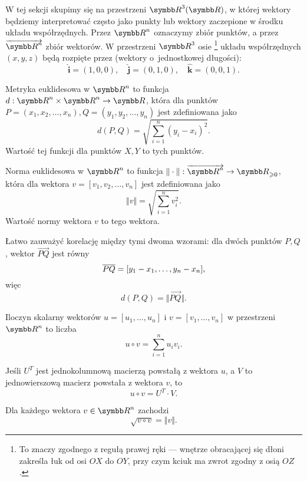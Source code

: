 W tej sekcji skupimy się na przestrzeni $\RR^3(\RR)$, w której wektory będziemy interpretować często jako punkty lub wektory zaczepione w środku układu współrzędnych. Przez $\RR^n$ oznaczymy zbiór punktów, a przez $\overrightarrow{\RR^n}$ zbiór wektorów. W przestrzeni $\RR^3$ osie \footnote{To znaczy zgodnego z regułą prawej ręki --- wnętrze obracającej się dłoni zakreśla łuk od osi $OX$ do $OY$, przy czym kciuk ma zwrot zgodny z osią $OZ$.} układu współrzędnych $(x, y, z)$ będą rozpięte przez  (wektory o~jednostkowej długości):
\[ \symbf{\hat{i}} = (1, 0, 0), \quad \symbf{\hat{j}} = (0, 1, 0), \quad \symbf{\hat{k}} = (0, 0, 1). \]

\begin{definition}
    \label{d:Euclidean metric}
    Metryka euklidesowa w $\RR^n$ to funkcja $d : \RR^n \times \RR^n \to \RR$, która dla punktów $P = (x_1, x_2, \ldots, x_n), Q = (y_1, y_2, \ldots, y_n)$ jest zdefiniowana jako
    \[ d(P, Q) = \sqrt{\sum_{i = 1}^n (y_i - x_i)^2}. \]
    Wartość tej funkcji dla punktów $X, Y$ to  tych punktów.
\end{definition}

\begin{definition}
    Norma euklidesowa w $\RR^n$ to funkcja $\Vert\cdot\Vert : \overrightarrow{\RR^n} \to \RR_{\geq 0}$, która dla wektora $v = [v_1, v_2, \ldots, v_n]$ jest zdefiniowana jako
    \[ \Vert v\Vert = \sqrt{\sum_{i=1}^n v_i^2}. \]
    Wartość normy wektora $v$ to  tego wektora.
\end{definition}

Łatwo zauważyć korelację między tymi dwoma wzorami: dla dwóch punktów $P, Q$, wektor $\overrightarrow{PQ}$ jest równy
\[ \overline{PQ} = [y_1 - x_1, \ldots, y_n - x_n], \]
więc
\[ d(P, Q) = \Vert\overrightarrow{PQ}\Vert. \]

\begin{definition}
    Iloczyn skalarny wektorów $u = [u_1, \ldots, u_n]$ i $v = [v_1, \ldots, v_n]$ w przestrzeni $\RR^n$ to liczba
    \[ u \circ v = \sum_{i=1}^n u_iv_i. \]
\end{definition}

\begin{fact}
    Jeśli $U^T$ jest jednokolumnową macierzą powstałą z wektora $u$, a $V$ to jednowierszową macierz powstała z wektora $v$, to
    \[ u \circ v = U^T \cdot V. \]
\end{fact}

\begin{fact}
    Dla każdego wektora $v \in \RR^n$ zachodzi
    \[ \sqrt{v \circ v} = \Vert v \Vert. \]
\end{fact}

